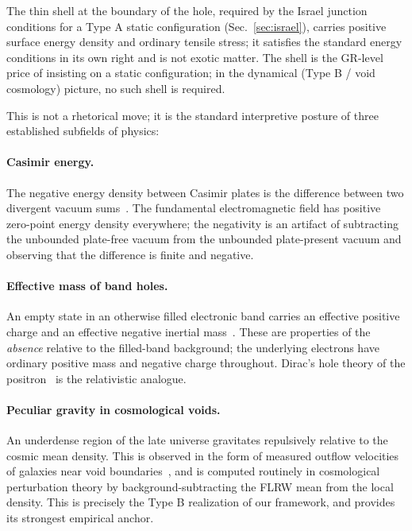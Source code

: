 \documentclass[%
  reprint,
  superscriptaddress,
  showpacs,
  showkeys,
  amsmath,amssymb,
  pra,
  longbibliography,
  floatfix,
  x11names
]{revtex4-2}
\begin{document}
The thin shell at the boundary of the hole, required by the Israel junction conditions for a Type A static configuration (Sec.~\ref{sec:israel}), carries positive surface energy density and ordinary tensile stress; it satisfies the standard energy conditions in its own right and is not exotic matter. The shell is the GR-level price of insisting on a static configuration; in the dynamical (Type B / void cosmology) picture, no such shell is required.

This is not a rhetorical move; it is the standard interpretive posture of three established subfields of physics:

\paragraph{Casimir energy.} The negative energy density between Casimir plates is the difference between two divergent vacuum sums~\cite{casimir-1948,milton-2001,bekenstein-2013}. The fundamental electromagnetic field has positive zero-point energy density everywhere; the negativity is an artifact of subtracting the unbounded plate-free vacuum from the unbounded plate-present vacuum and observing that the difference is finite and negative.

\paragraph{Effective mass of band holes.} An empty state in an otherwise filled electronic band carries an effective positive charge and an effective negative inertial mass~\cite{kittel-ssp,ashcroft-mermin}. These are properties of the \emph{absence} relative to the filled-band background; the underlying electrons have ordinary positive mass and negative charge throughout. Dirac's hole theory of the positron~\cite{dirac-1930} is the relativistic analogue.

\paragraph{Peculiar gravity in cosmological voids.} An underdense region of the late universe gravitates repulsively relative to the cosmic mean density. This is observed in the form of measured outflow velocities of galaxies near void boundaries~\cite{shethvdw-2004,hamaus-2014,nadathur-2019}, and is computed routinely in cosmological perturbation theory by background-subtracting the FLRW mean from the local density. This is precisely the Type B realization of our framework, and provides its strongest empirical anchor.
\end{document}
